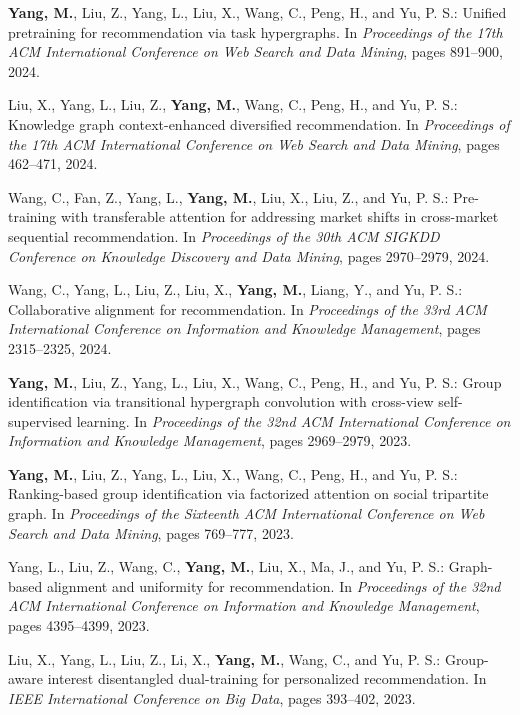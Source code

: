 \begin{list}{}
\item[] \textbf{Yang, M.}, Liu, Z., Yang, L., Liu, X., Wang, C., Peng, H., and Yu, P. S.: Unified pretraining for recommendation via task hypergraphs. In \textit{Proceedings of the 17th ACM International Conference on Web Search and Data Mining}, pages 891--900, 2024.

\item[] Liu, X., Yang, L., Liu, Z., \textbf{Yang, M.}, Wang, C., Peng, H., and Yu, P. S.: Knowledge graph context-enhanced diversified recommendation. In \textit{Proceedings of the 17th ACM International Conference on Web Search and Data Mining}, pages 462--471, 2024.

\item[] Wang, C., Fan, Z., Yang, L., \textbf{Yang, M.}, Liu, X., Liu, Z., and Yu, P. S.: Pre-training with transferable attention for addressing market shifts in cross-market sequential recommendation. In \textit{Proceedings of the 30th ACM SIGKDD Conference on Knowledge Discovery and Data Mining}, pages 2970--2979, 2024.

\item[] Wang, C., Yang, L., Liu, Z., Liu, X., \textbf{Yang, M.}, Liang, Y., and Yu, P. S.: Collaborative alignment for recommendation. In \textit{Proceedings of the 33rd ACM International Conference on Information and Knowledge Management}, pages 2315--2325, 2024.

\item[] \textbf{Yang, M.}, Liu, Z., Yang, L., Liu, X., Wang, C., Peng, H., and Yu, P. S.: Group identification via transitional hypergraph convolution with cross-view self-supervised learning. In \textit{Proceedings of the 32nd ACM International Conference on Information and Knowledge Management}, pages 2969--2979, 2023.

\item[] \textbf{Yang, M.}, Liu, Z., Yang, L., Liu, X., Wang, C., Peng, H., and Yu, P. S.: Ranking-based group identification via factorized attention on social tripartite graph. In \textit{Proceedings of the Sixteenth ACM International Conference on Web Search and Data Mining}, pages 769--777, 2023.

\item[] Yang, L., Liu, Z., Wang, C., \textbf{Yang, M.}, Liu, X., Ma, J., and Yu, P. S.: Graph-based alignment and uniformity for recommendation. In \textit{Proceedings of the 32nd ACM International Conference on Information and Knowledge Management}, pages 4395--4399, 2023.

\item[] Liu, X., Yang, L., Liu, Z., Li, X., \textbf{Yang, M.}, Wang, C., and Yu, P. S.: Group-aware interest disentangled dual-training for personalized recommendation. In \textit{IEEE International Conference on Big Data}, pages 393--402, 2023.


\end{list}
